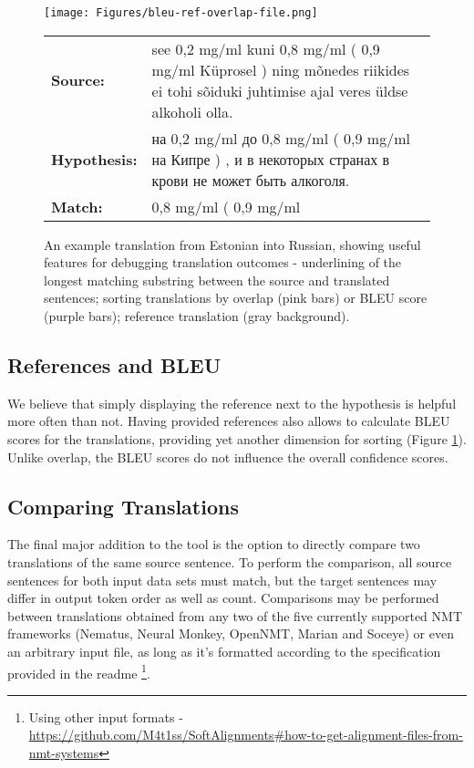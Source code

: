 \documentclass[runningheads,a4paper]{lncs/llncs}
\begin{document}
\begin{figure}[ht]
  \texttt{[image: Figures/bleu-ref-overlap-file.png]}
  \begin{tabular}{lp{10.4cm}}
   \bf Source: & see 0,2 mg/ml kuni 0,8 mg/ml ( 0,9 mg/ml Küprosel ) ning mõnedes riikides ei tohi sõiduki juhtimise ajal veres üldse alkoholi olla.  \\
   \bf Hypothesis: & \foreignlanguage{russian}{на 0,2 mg/ml до 0,8 mg/ml ( 0,9 mg/ml на Кипре ) , и в некоторых странах в крови не может быть алкоголя.}  \\
   \bf Match: & 0,8 mg/ml ( 0,9 mg/ml \\
  \end{tabular}
  \caption{An example translation from Estonian into Russian, showing useful features for debugging translation outcomes - underlining of the longest matching substring between the source and translated sentences; sorting translations by overlap (pink bars) or BLEU score (purple bars); reference translation (gray background).}
  \label{fig:overlap-bleu}
\end{figure}

\subsection{References and BLEU}
\label{sec:bleu}

We believe that simply displaying the reference next to the hypothesis is helpful more often than not. Having provided references also allows to calculate BLEU scores for the translations, providing yet another dimension for sorting (Figure \ref{fig:overlap-bleu}). Unlike overlap, the BLEU scores do not influence the overall confidence scores.







\subsection{Comparing Translations}
\label{sec:cmp}

The final major addition to the tool is the option to directly compare two translations of the same source sentence. To perform the comparison, all source sentences for both input data sets must match, but the target sentences may differ in output token order as well as count. Comparisons may be performed between translations obtained from any two of the five currently supported NMT frameworks (Nematus, Neural Monkey, OpenNMT, Marian and Soceye) or even an arbitrary input file, as long as it's formatted according to the specification provided in the readme \footnote{Using other input formats - \url{https://github.com/M4t1ss/SoftAlignments\#how-to-get-alignment-files-from-nmt-systems}}.
\end{document}
